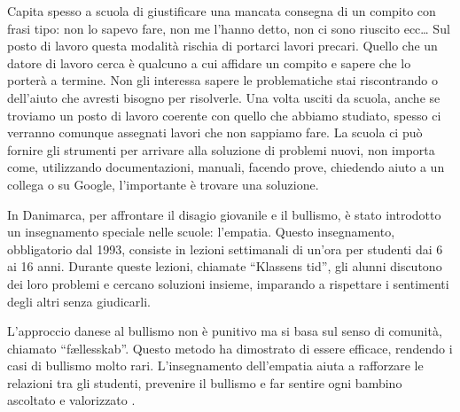 \documentclass[12pt]{book} %
\begin{document}
Capita spesso a scuola di giustificare una mancata consegna di un compito con frasi tipo: non lo sapevo fare, non me
l'hanno detto, non ci sono riuscito ecc… Sul posto di lavoro questa modalità rischia di portarci lavori precari. Quello che un datore di lavoro cerca è qualcuno a cui affidare un compito e sapere che lo porterà a termine.
Non gli interessa sapere le problematiche stai riscontrando o dell'aiuto che avresti bisogno per risolverle. Una
volta usciti da scuola, anche se troviamo un posto di lavoro coerente con
quello che abbiamo studiato, spesso ci verranno comunque assegnati lavori che non sappiamo fare. La scuola ci può fornire gli strumenti per
arrivare alla soluzione di problemi nuovi, non importa come, utilizzando documentazioni, manuali, facendo prove,
chiedendo aiuto a un collega o su Google, l'importante è trovare una soluzione. 

\begin{mdframed}[linewidth=1pt]
In Danimarca, per affrontare il disagio giovanile e il bullismo, è stato introdotto un insegnamento speciale nelle scuole: l’empatia. Questo insegnamento, obbligatorio dal 1993, consiste in lezioni settimanali di un’ora per studenti dai 6 ai 16 anni. Durante queste lezioni, chiamate “Klassens tid”, gli alunni discutono dei loro problemi e cercano soluzioni insieme, imparando a rispettare i sentimenti degli altri senza giudicarli.

L’approccio danese al bullismo non è punitivo ma si basa sul senso di comunità, chiamato “fællesskab”. Questo metodo ha dimostrato di essere efficace, rendendo i casi di bullismo molto rari. L’insegnamento dell’empatia aiuta a rafforzare le relazioni tra gli studenti, prevenire il bullismo e far sentire ogni bambino ascoltato e valorizzato    .
\end{mdframed}

\bigskip
\end{document}
